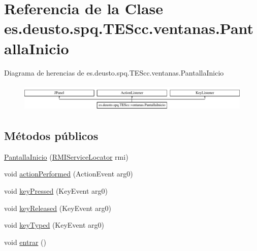 \hypertarget{classes_1_1deusto_1_1spq_1_1_t_e_scc_1_1ventanas_1_1_pantalla_inicio}{\section{Referencia de la Clase es.\+deusto.\+spq.\+T\+E\+Scc.\+ventanas.\+Pantalla\+Inicio}
\label{classes_1_1deusto_1_1spq_1_1_t_e_scc_1_1ventanas_1_1_pantalla_inicio}
}
Diagrama de herencias de es.\+deusto.\+spq.\+T\+E\+Scc.\+ventanas.\+Pantalla\+Inicio\begin{figure}[H]
\begin{center}
\leavevmode
\includegraphics[height=1.372549cm]{classes_1_1deusto_1_1spq_1_1_t_e_scc_1_1ventanas_1_1_pantalla_inicio}
\end{center}
\end{figure}
\subsection*{Métodos públicos}
\begin{DoxyCompactItemize}
\item 
\hyperlink{classes_1_1deusto_1_1spq_1_1_t_e_scc_1_1ventanas_1_1_pantalla_inicio_a2cae6f7d424fc1159d31ac3982b6dce5}{Pantalla\+Inicio} (\hyperlink{classes_1_1deusto_1_1spq_1_1_t_e_scc_1_1cliente_1_1_r_m_i_service_locator}{R\+M\+I\+Service\+Locator} rmi)
\item 
void \hyperlink{classes_1_1deusto_1_1spq_1_1_t_e_scc_1_1ventanas_1_1_pantalla_inicio_ad86a1735149a6800959e4958d5b75e95}{action\+Performed} (Action\+Event arg0)
\item 
void \hyperlink{classes_1_1deusto_1_1spq_1_1_t_e_scc_1_1ventanas_1_1_pantalla_inicio_ad4610e7d84dd838b91ab0f1e60737c58}{key\+Pressed} (Key\+Event arg0)
\item 
void \hyperlink{classes_1_1deusto_1_1spq_1_1_t_e_scc_1_1ventanas_1_1_pantalla_inicio_a92b1d127a92be155643dfa65b15e143f}{key\+Released} (Key\+Event arg0)
\item 
void \hyperlink{classes_1_1deusto_1_1spq_1_1_t_e_scc_1_1ventanas_1_1_pantalla_inicio_a152f4193e0453e9026446cc4c2a32666}{key\+Typed} (Key\+Event arg0)
\item 
void \hyperlink{classes_1_1deusto_1_1spq_1_1_t_e_scc_1_1ventanas_1_1_pantalla_inicio_abbdd2b42690b8bd6cc5296f0e7f49c98}{entrar} ()
\end{DoxyCompactItemize}


